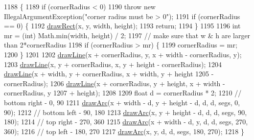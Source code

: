 \begin{DoxyCode}
1188                                         \{
1189         \textcolor{keywordflow}{if} (cornerRadius < 0)
1190             \textcolor{keywordflow}{throw} \textcolor{keyword}{new} IllegalArgumentException(\textcolor{stringliteral}{"corner radius must be > 0"});
1191         \textcolor{keywordflow}{if} (cornerRadius == 0) \{
1192             \mbox{\hyperlink{classorg_1_1newdawn_1_1slick_1_1_graphics_a8ee4ef6a2e90cdd55f376429b7753d52}{drawRect}}(x, y, width, height);
1193             \textcolor{keywordflow}{return};
1194         \}
1195 
1196         \textcolor{keywordtype}{int} mr = (int) Math.min(width, height) / 2;
1197         \textcolor{comment}{// make sure that w & h are larger than 2*cornerRadius}
1198         \textcolor{keywordflow}{if} (cornerRadius > mr) \{
1199             cornerRadius = mr;
1200         \}
1201 
1202         \mbox{\hyperlink{classorg_1_1newdawn_1_1slick_1_1_graphics_ac889330d5c5b2b787db5a21ae3fc90ae}{drawLine}}(x + cornerRadius, y, x + width - cornerRadius, y);
1203         \mbox{\hyperlink{classorg_1_1newdawn_1_1slick_1_1_graphics_ac889330d5c5b2b787db5a21ae3fc90ae}{drawLine}}(x, y + cornerRadius, x, y + height - cornerRadius);
1204         \mbox{\hyperlink{classorg_1_1newdawn_1_1slick_1_1_graphics_ac889330d5c5b2b787db5a21ae3fc90ae}{drawLine}}(x + width, y + cornerRadius, x + width, y + height
1205                 - cornerRadius);
1206         \mbox{\hyperlink{classorg_1_1newdawn_1_1slick_1_1_graphics_ac889330d5c5b2b787db5a21ae3fc90ae}{drawLine}}(x + cornerRadius, y + height, x + width - cornerRadius, y
1207                 + height);
1208 
1209         \textcolor{keywordtype}{float} d = cornerRadius * 2;
1210         \textcolor{comment}{// bottom right - 0, 90}
1211         \mbox{\hyperlink{classorg_1_1newdawn_1_1slick_1_1_graphics_aff0300433dbe9ce3c4d73ee73173dba4}{drawArc}}(x + width - d, y + height - d, d, d, segs, 0, 90);
1212         \textcolor{comment}{// bottom left - 90, 180}
1213         \mbox{\hyperlink{classorg_1_1newdawn_1_1slick_1_1_graphics_aff0300433dbe9ce3c4d73ee73173dba4}{drawArc}}(x, y + height - d, d, d, segs, 90, 180);
1214         \textcolor{comment}{// top right - 270, 360}
1215         \mbox{\hyperlink{classorg_1_1newdawn_1_1slick_1_1_graphics_aff0300433dbe9ce3c4d73ee73173dba4}{drawArc}}(x + width - d, y, d, d, segs, 270, 360);
1216         \textcolor{comment}{// top left - 180, 270}
1217         \mbox{\hyperlink{classorg_1_1newdawn_1_1slick_1_1_graphics_aff0300433dbe9ce3c4d73ee73173dba4}{drawArc}}(x, y, d, d, segs, 180, 270);
1218     \}
\end{DoxyCode}
\mbox{\label{classorg_1_1newdawn_1_1slick_1_1_graphics_a94021ab8d17140db411b6bb92f35ef31}} 
